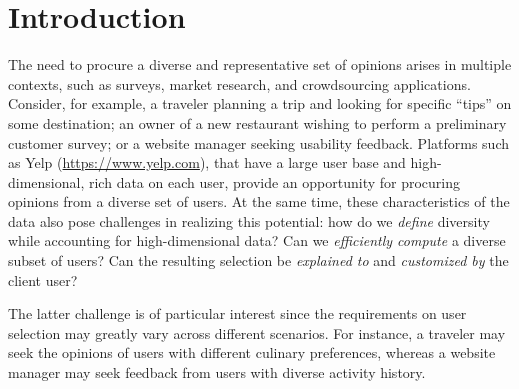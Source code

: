 

\section{Introduction}
\label{sec:intro} 


The need to procure a diverse and representative set of opinions arises in multiple contexts, such as surveys, market research, and crowdsourcing applications. Consider, for example, a traveler planning a trip and looking for specific ``tips'' on some destination; an owner of a new restaurant wishing to perform a preliminary customer survey; or a website manager seeking usability feedback. Platforms such as Yelp (\url{https://www.yelp.com}), that have a large user base and high-dimensional, rich data on each user, provide an opportunity for procuring opinions from a diverse set of users. At the same time, these characteristics of the data also pose challenges in realizing this potential: how do we \emph{define} diversity while accounting for high-dimensional data? Can we \emph{efficiently compute} a diverse subset of users? Can the resulting selection be \emph{explained to} and \emph{customized by} the client user? 

The latter challenge is of particular interest since the requirements on user selection may greatly vary across different scenarios. For instance, a traveler may seek the opinions of users with different culinary preferences, whereas a website manager may seek feedback from users with diverse activity history. 

%
%
%
%







